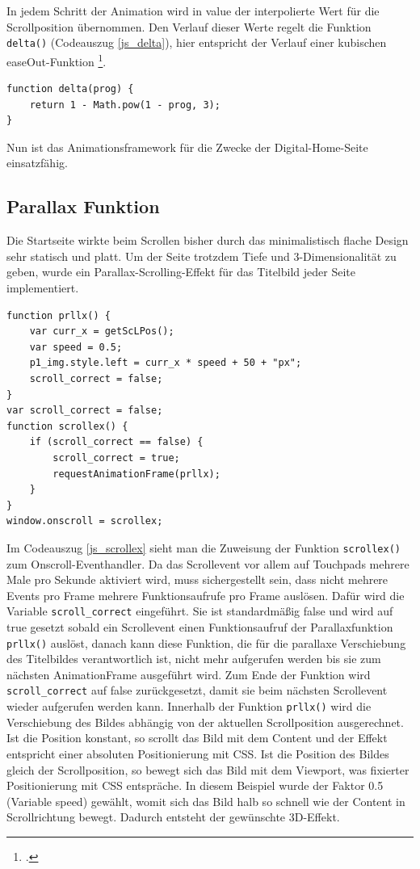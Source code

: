 In jedem Schritt der Animation wird in value der interpolierte Wert für die Scrollposition übernommen. Den Verlauf dieser Werte regelt die Funktion \lstinline{delta()} (Codeauszug \ref{js_delta}), hier entspricht der Verlauf einer kubischen easeOut-Funktion \footcite[vgl.][]{easeOut}.



\begin{lstlisting}[caption=Die Funktion delta., label=js_delta]
function delta(prog) {
	return 1 - Math.pow(1 - prog, 3);
}
\end{lstlisting}

Nun ist das Animationsframework für die Zwecke der Digital-Home-Seite einsatzfähig.

\subsection{Parallax Funktion}
Die Startseite wirkte beim Scrollen bisher durch das minimalistisch flache Design sehr statisch und platt. Um der Seite trotzdem Tiefe und 3-Dimensionalität zu geben, wurde ein Parallax-Scrolling-Effekt für das Titelbild jeder Seite implementiert.

\begin{lstlisting}[caption=Das Onscroll-Event und die Parallax-Callbackfunktion., label=js_scrollex]
function prllx() {
	var curr_x = getScLPos();
	var speed = 0.5;
	p1_img.style.left = curr_x * speed + 50 + "px";
	scroll_correct = false;
}
var scroll_correct = false;
function scrollex() {
	if (scroll_correct == false) {
		scroll_correct = true;
		requestAnimationFrame(prllx);
	}
}
window.onscroll = scrollex;
\end{lstlisting}

Im Codeauszug \ref{js_scrollex} sieht man die Zuweisung der Funktion \lstinline{scrollex()} zum Onscroll-Eventhandler. Da das Scrollevent vor allem auf Touchpads mehrere Male pro Sekunde aktiviert wird, muss sichergestellt sein, dass nicht mehrere Events pro Frame mehrere Funktionsaufrufe pro Frame auslösen. Dafür wird die Variable \lstinline{scroll_correct} eingeführt. Sie ist standardmäßig false und wird auf true gesetzt sobald ein Scrollevent einen Funktionsaufruf der Parallaxfunktion \lstinline{prllx()} auslöst, danach kann diese Funktion, die für die parallaxe Verschiebung des Titelbildes verantwortlich ist, nicht mehr aufgerufen werden bis sie zum nächsten AnimationFrame ausgeführt wird. Zum Ende der Funktion wird \lstinline{scroll_correct} auf false zurückgesetzt, damit sie beim nächsten Scrollevent wieder aufgerufen werden kann. Innerhalb der Funktion \lstinline{prllx()} wird die Verschiebung des Bildes abhängig von der aktuellen Scrollposition ausgerechnet. Ist die Position konstant, so scrollt das Bild mit dem Content und der Effekt entspricht einer absoluten Positionierung mit CSS. Ist die Position des Bildes gleich der Scrollposition, so bewegt sich das Bild mit dem Viewport, was fixierter Positionierung mit CSS entspräche. In diesem Beispiel wurde der Faktor 0.5 (Variable speed) gewählt, womit sich das Bild halb so schnell wie der Content in Scrollrichtung bewegt. Dadurch entsteht der gewünschte 3D-Effekt.




